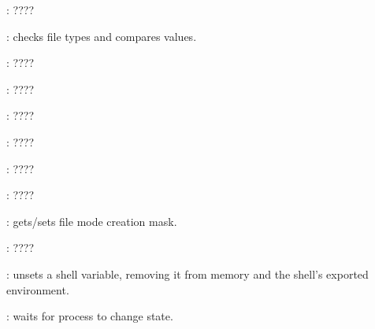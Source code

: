 \begin{compactenum}
\item [\symbolbash] : \dotfill ????

\item [\symbolbash] : checks file types and compares values.

\item [\symbolbash] : \dotfill ????

\item [\symbolbash] : \dotfill ????

\item [\symbolbash] : \dotfill ????

\item [\symbolbash] : \dotfill ????

\item [\symbolbash] : \dotfill ????

\item [\symbolbash] : \dotfill ????

\item [\symbolbash] : gets/sets file mode creation mask.

\item [\symbolbash] : \dotfill ????

\item [\symbolbash] : unsets a shell variable, removing it from memory and the shell's exported environment.

\item [\symbolbash] : waits for process to change state.
\end{compactenum}


